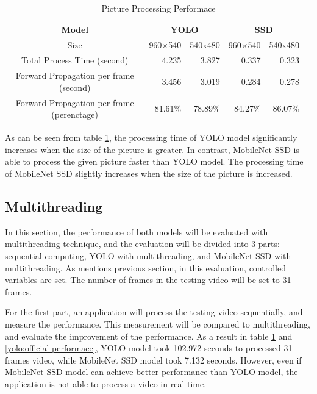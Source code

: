             \begin{table}[!htp]\centering
                \scriptsize
                \begin{tabular}{lrrrrrr}\toprule
                    \multicolumn{2}{c}{Model} &\multicolumn{2}{c}{YOLO} &\multicolumn{2}{c}{SSD} \\\midrule
                    \multicolumn{2}{c}{Size} &960×540 &540x480 &960×540 &540x480 \\
                    \multicolumn{2}{c}{Total Process Time (second)} &4.235 &3.827 &0.337 &0.323 \\
                    \multicolumn{2}{c}{Forward Propagation per frame (second)} &3.456 &3.019 &0.284 &0.278 \\
                    \multicolumn{2}{c}{Forward Propagation per frame (perenctage)} &81.61\% &78.89\% &84.27\% &86.07\% \\
                    \bottomrule
                \end{tabular}

                \caption{Picture Processing Performace}\label{performance:picture}
            \end{table}

            As can be seen from table \ref{performance:picture}, the processing time of YOLO model significantly increases when the size of the picture is greater.
            In contrast, MobileNet SSD is able to process the given picture faster than YOLO model.
            The processing time of MobileNet SSD slightly increases when the size of the picture is increased.

        \subsection{Multithreading}

            In this section, the performance of both models will be evaluated with multithreading technique,
            and the evaluation will be divided into 3 parts: sequential computing, YOLO with multithreading, and MobileNet SSD with multithreading.
            As mentions previous section, in this evaluation, controlled variables are set.
            The number of frames in the testing video will be set to 31 frames.

            For the first part, an application will process the testing video sequentially, and measure the performance.
            This measurement will be compared to multithreading, and evaluate the improvement of the performance.
            As a result in table \ref{performance:picture} and \ref{yolo:official-performace},
            YOLO model took 102.972 seconds to processed 31 frames video, while MobileNet SSD model took 7.132 seconds.
            However, even if MobileNet SSD model can achieve better performance than YOLO model,
            the application is not able to process a video in real-time.

